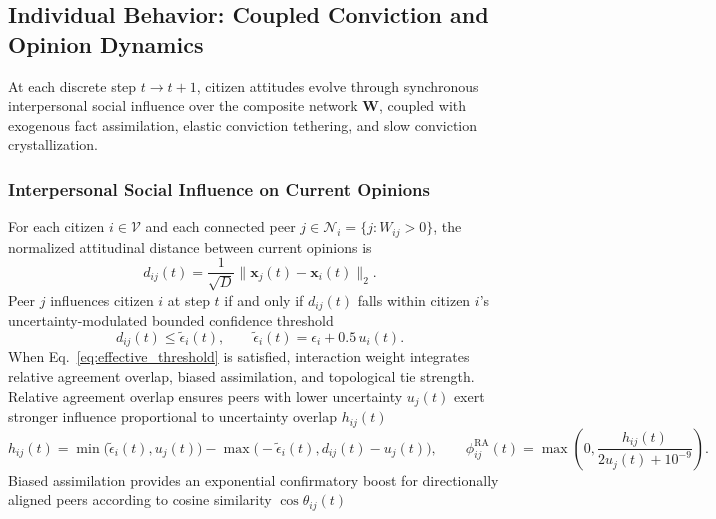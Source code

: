 \documentclass{article}
\begin{document}
\subsection{Individual Behavior: Coupled Conviction and Opinion Dynamics}
\label{subsec:dynamics_equations}

At each discrete step $t \to t + 1$, citizen attitudes evolve through synchronous interpersonal social influence over the composite network $\mathbf{W}$, coupled with exogenous fact assimilation, elastic conviction tethering, and slow conviction crystallization.

\subsubsection{Interpersonal Social Influence on Current Opinions}
For each citizen $i \in \mathcal{V}$ and each connected peer $j \in \mathcal{N}_i = \{j : W_{ij} > 0\}$, the normalized attitudinal distance between current opinions is
\begin{equation}
    d_{ij}(t) = \frac{1}{\sqrt{D}} \|\mathbf{x}_j(t) - \mathbf{x}_i(t)\|_2.
    \label{eq:peer_dist}
\end{equation}
Peer $j$ influences citizen $i$ at step $t$ if and only if $d_{ij}(t)$ falls within citizen $i$'s uncertainty-modulated bounded confidence threshold \citep{deffuant2000mixing, deffuant2002how, hegselmann2002opinion}
\begin{equation}
    d_{ij}(t) \le \tilde{\epsilon}_i(t), \qquad \tilde{\epsilon}_i(t) = \epsilon_i + 0.5\,u_i(t).
    \label{eq:effective_threshold}
\end{equation}
When Eq.~\eqref{eq:effective_threshold} is satisfied, interaction weight integrates relative agreement overlap, biased assimilation, and topological tie strength. Relative agreement overlap \citep{deffuant2002how} ensures peers with lower uncertainty $u_j(t)$ exert stronger influence proportional to uncertainty overlap $h_{ij}(t)$
\begin{equation}
    h_{ij}(t) = \min\!\big(\tilde{\epsilon}_i(t), u_j(t)\big) - \max\!\big(-\tilde{\epsilon}_i(t), d_{ij}(t) - u_j(t)\big), \qquad
    \phi_{ij}^{\mathrm{RA}}(t) = \max\!\left(0, \frac{h_{ij}(t)}{2u_j(t) + 10^{-9}}\right).
    \label{eq:relative_agreement}
\end{equation}
Biased assimilation \citep{lord1979biased, dandekar2013biased} provides an exponential confirmatory boost for directionally aligned peers according to cosine similarity $\cos\theta_{ij}(t)$
\end{document}
